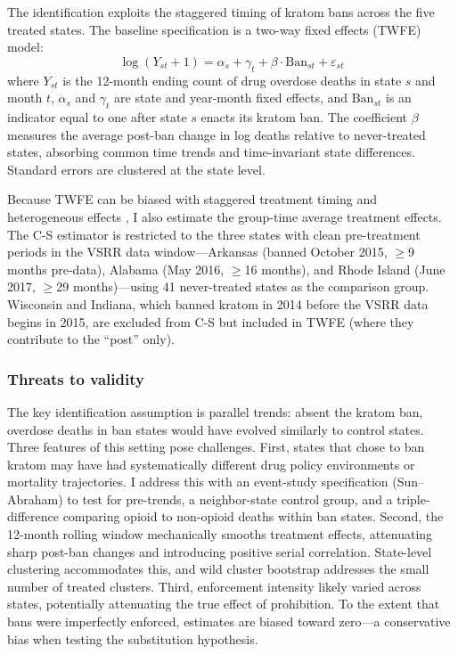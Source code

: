 \documentclass[12pt]{article}
\begin{document}
The identification exploits the staggered timing of kratom bans across the five treated states. The baseline specification is a two-way fixed effects (TWFE) model:
\begin{equation}
\log(Y_{st} + 1) = \alpha_s + \gamma_t + \beta \cdot \text{Ban}_{st} + \varepsilon_{st}
\label{eq:twfe}
\end{equation}
where $Y_{st}$ is the 12-month ending count of drug overdose deaths in state $s$ and month $t$, $\alpha_s$ and $\gamma_t$ are state and year-month fixed effects, and $\text{Ban}_{st}$ is an indicator equal to one after state $s$ enacts its kratom ban. The coefficient $\beta$ measures the average post-ban change in log deaths relative to never-treated states, absorbing common time trends and time-invariant state differences. Standard errors are clustered at the state level.

Because TWFE can be biased with staggered treatment timing and heterogeneous effects \citep{goodman2021difference, de2020two, sun2021estimating}, I also estimate the \citet{callaway2021difference} group-time average treatment effects. The C-S estimator is restricted to the three states with clean pre-treatment periods in the VSRR data window---Arkansas (banned October 2015, $\geq$9 months pre-data), Alabama (May 2016, $\geq$16 months), and Rhode Island (June 2017, $\geq$29 months)---using 41 never-treated states as the comparison group. Wisconsin and Indiana, which banned kratom in 2014 before the VSRR data begins in 2015, are excluded from C-S but included in TWFE (where they contribute to the ``post'' only).

\subsubsection*{Threats to validity} The key identification assumption is parallel trends: absent the kratom ban, overdose deaths in ban states would have evolved similarly to control states. Three features of this setting pose challenges. First, states that chose to ban kratom may have had systematically different drug policy environments or mortality trajectories. I address this with an event-study specification (Sun--Abraham) to test for pre-trends, a neighbor-state control group, and a triple-difference comparing opioid to non-opioid deaths within ban states. Second, the 12-month rolling window mechanically smooths treatment effects, attenuating sharp post-ban changes and introducing positive serial correlation. State-level clustering accommodates this, and wild cluster bootstrap addresses the small number of treated clusters. Third, enforcement intensity likely varied across states, potentially attenuating the true effect of prohibition. To the extent that bans were imperfectly enforced, estimates are biased toward zero---a conservative bias when testing the substitution hypothesis.
\end{document}
